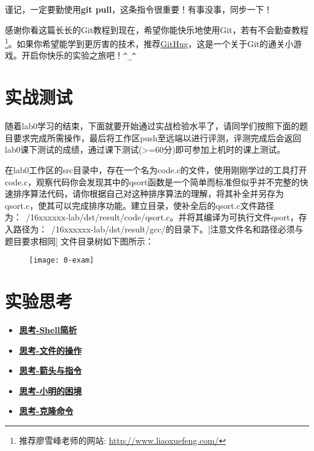 谨记，一定要勤使用\textbf{git pull}，这条指令很重要！有事没事，同步一下！

感谢你看这篇长长的Git教程到现在，希望你能快乐地使用Git，若有不会勤查教程\footnote{推荐廖雪峰老师的网站:
\url{http://www.liaoxuefeng.com/}}。如果你希望能学到更厉害的技术，推荐\href{https://github.com/Gazler/githug}{GitHug}，这是一个关于Git的通关小游戏。开启你快乐的实验之旅吧！\verb|^_^|

\section{实战测试}
随着lab0学习的结束，下面就要开始通过实战检验水平了，请同学们按照下面的题目要求完成所需操作，最后将工作区push至远端以进行评测，评测完成后会返回lab0课下测试的成绩，通过课下测试(>=60分)即可参加上机时的课上测试。
\begin{exercise}
在lab0工作区的src目录中，存在一个名为code.c的文件，使用刚刚学过的工具打开code.c，观察代码你会发现其中的qsort函数是一个简单而标准但似乎并不完整的快速排序算法代码，请你根据自己对这种排序算法的理解，将其补全并另存为qsort.c，使其可以完成排序功能。建立目录，使补全后的qsort.c文件路径为：~/16xxxxxx-lab/dst/result/code/qsort.c。并将其编译为可执行文件qsort，存入路径为：~/16xxxxxx-lab/dst/result/gcc/的目录下。[注意文件名和路径必须与题目要求相同]
文件目录树如下图所示：
\end{exercise}
\begin{figure}[htbp]
  \centering
  \texttt{[image: 0-exam]}
\end{figure}

\section{实验思考}
\begin{itemize}
\item \hyperref[think-Shell简析]{\textbf{\textcolor{baseB}{思考-Shell简析}}}
\item \hyperref[think-文件的操作]{\textbf{\textcolor{baseB}{思考-文件的操作}}}
\item \hyperref[think-箭头与指令]{\textbf{\textcolor{baseB}{思考-箭头与指令}}}
\item \hyperref[think-小明的困境]{\textbf{\textcolor{baseB}{思考-小明的困境}}}
\item \hyperref[think-克隆]{\textbf{\textcolor{baseB}{思考-克隆命令}}}
\end{itemize}
